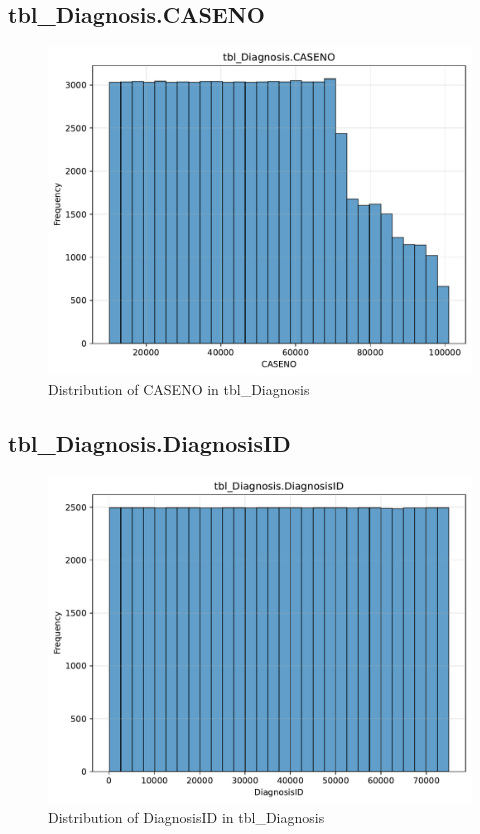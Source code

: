 \subsection{tbl\_Diagnosis.CASENO}

\begin{figure}[htbp]
\centering
\includegraphics[width=\textwidth]{figures/dbo_tbl_Diagnosis_CASENO.pdf}
\caption{Distribution of CASENO in tbl\_Diagnosis}
\end{figure}\newpage

\subsection{tbl\_Diagnosis.DiagnosisID}

\begin{figure}[htbp]
\centering
\includegraphics[width=\textwidth]{figures/dbo_tbl_Diagnosis_DiagnosisID.pdf}
\caption{Distribution of DiagnosisID in tbl\_Diagnosis}
\end{figure}\newpage

